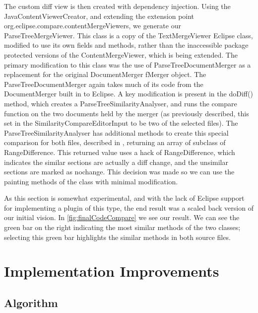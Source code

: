 The custom diff view is then created with dependency injection. Using the
JavaContentViewerCreator\cite{rubenlaguna}, and extending the extension point
org.eclipse.compare.contentMergeViewers, we generate our ParseTreeMergeViewer.
This class is a copy of the TextMergeViewer Eclipse class, modified to use
its own fields and methods, rather than the inaccessible package protected versions
of the ContentMergeViewer, which is being extended. The primary modification
to this class was the use of ParseTreeDocumentMerger as a replacement for the
original DocumentMerger fMerger object. The ParseTreeDocumentMerger again takes
much of its code from the DocumentMerger built in to Eclipse. A key modification
is present in the doDiff() method, which creates a ParseTreeSimilarityAnalyser,
and runs the compare function on the two documents held by the merger (as 
previously described, this set in the SimilarityCompareEditorInput to be
two of the selected files). The ParseTreeSimilarityAnalyser has additional
methods to create this special comparison for both files, described in 
, returning an array of subclass of RangeDifference.
This returned value uses a hack of RangeDifference, which indicates the similar
sections are actually a diff change, and the unsimilar sections are marked
as nochange. This decision was made so we can use the painting methods of the
class with minimal modification.

As this section is somewhat experimental, and with the lack of Eclipse
support for implementing a plugin of this type, the end result was a scaled
back version of our initial vision. In \cref{fig:finalCodeCompare} we see
our result. We can see the green bar on the right indicating the most similar
methods of the two classes; selecting this green bar highlights the similar
methods in both source files.




\chapter{Implementation Improvements}

\section{Algorithm}

